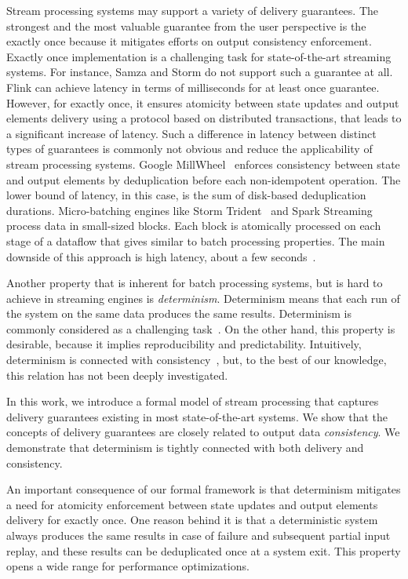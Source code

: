 Stream processing systems may support a variety of delivery guarantees. The strongest and the most valuable guarantee from the user perspective is the exactly once because it mitigates efforts on output consistency enforcement. Exactly once implementation is a challenging task for state-of-the-art streaming systems. For instance, Samza and Storm do not support such a guarantee at all. Flink can achieve latency in terms of milliseconds for at least once guarantee. However, for exactly once, it ensures atomicity between state updates and output elements delivery using a protocol based on distributed transactions, that leads to a significant increase of latency. Such a difference in latency between distinct types of guarantees is commonly not obvious and reduce the applicability of stream processing systems. Google MillWheel~\cite{Akidau:2013:MFS:2536222.2536229} enforces consistency between state and output elements by deduplication before each non-idempotent operation. The lower bound of latency, in this case, is the sum of disk-based deduplication durations. Micro-batching engines like Storm Trident~\cite{apache:storm:trident} and Spark Streaming~\cite{Zaharia:2012:DSE:2342763.2342773} process data in small-sized blocks. Each block is atomically processed on each stage of a dataflow that gives similar to batch processing properties. The main downside of this approach is high latency, about a few seconds~\cite{7530084, 7474816}.

Another property that is inherent for batch processing systems, but is hard to achieve in streaming engines is {\em determinism}. Determinism means that each run of the system on the same data produces the same results. Determinism is commonly considered as a challenging task~\cite{Zacheilas:2017:MDS:3093742.3093921}. On the other hand, this property is desirable, because it implies reproducibility and predictability. Intuitively, determinism is connected with consistency~\cite{Stonebraker:2005:RRS:1107499.1107504}, but, to the best of our knowledge, this relation has not been deeply investigated. 

In this work, we introduce a formal model of stream processing that captures delivery guarantees existing in most state-of-the-art systems. We show that the concepts of delivery guarantees are closely related to output data {\em consistency}. We demonstrate that determinism is tightly connected with both delivery and consistency. 

An important consequence of our formal framework is that determinism mitigates a need for atomicity enforcement between state updates and output elements delivery for exactly once. One reason behind it is that a deterministic system always produces the same results in case of failure and subsequent partial input replay, and these results can be deduplicated once at a system exit. This property opens a wide range for performance optimizations.

